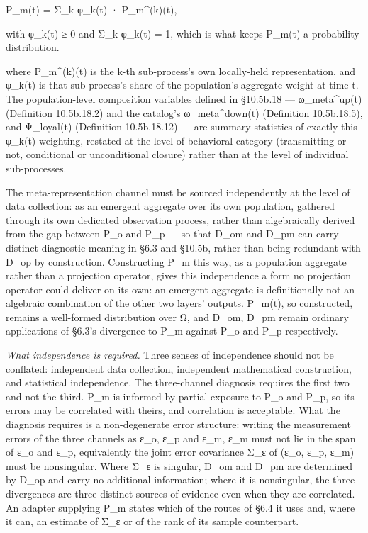 \documentclass[
]{article}
\begin{document}
P\_m(t) = Σ\_k φ\_k(t) · P\_m\^{}(k)(t),

with φ\_k(t) ≥ 0 and Σ\_k φ\_k(t) = 1, which is what keeps P\_m(t) a
probability distribution.

where P\_m\^{}(k)(t) is the k-th sub-process's own locally-held
representation, and φ\_k(t) is that sub-process's share of the
population's aggregate weight at time t. The population-level
composition variables defined in §10.5b.18 --- ω\_meta\^{}up(t)
(Definition 10.5b.18.2) and the catalog's ω\_meta\^{}down(t) (Definition
10.5b.18.5), and Ψ\_loyal(t) (Definition 10.5b.18.12) --- are summary
statistics of exactly this φ\_k(t) weighting, restated at the level of
behavioral category (transmitting or not, conditional or unconditional
closure) rather than at the level of individual sub-processes.

The meta-representation channel must be sourced independently at the
level of data collection: as an emergent aggregate over its own
population, gathered through its own dedicated observation process,
rather than algebraically derived from the gap between P\_o and P\_p ---
so that D\_om and D\_pm can carry distinct diagnostic meaning in §6.3
and §10.5b, rather than being redundant with D\_op by construction.
Constructing P\_m this way, as a population aggregate rather than a
projection operator, gives this independence a form no projection
operator could deliver on its own: an emergent aggregate is
definitionally not an algebraic combination of the other two layers'
outputs. P\_m(t), so constructed, remains a well-formed distribution
over Ω, and D\_om, D\_pm remain ordinary applications of §6.3's
divergence to P\_m against P\_o and P\_p respectively.

\emph{What independence is required.} Three senses of independence
should not be conflated: independent data collection, independent
mathematical construction, and statistical independence. The
three-channel diagnosis requires the first two and not the third. P\_m
is informed by partial exposure to P\_o and P\_p, so its errors may be
correlated with theirs, and correlation is acceptable. What the
diagnosis requires is a non-degenerate error structure: writing the
measurement errors of the three channels as ε\_o, ε\_p and ε\_m, ε\_m
must not lie in the span of ε\_o and ε\_p, equivalently the joint error
covariance Σ\_ε of (ε\_o, ε\_p, ε\_m) must be nonsingular. Where Σ\_ε is
singular, D\_om and D\_pm are determined by D\_op and carry no
additional information; where it is nonsingular, the three divergences
are three distinct sources of evidence even when they are correlated. An
adapter supplying P\_m states which of the routes of §6.4 it uses and,
where it can, an estimate of Σ\_ε or of the rank of its sample
counterpart.
\end{document}
